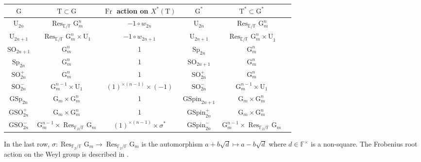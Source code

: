 \documentclass[12pt, reqno]{amsart}
\theoremstyle{definition}
\theoremstyle{definition}
\theoremstyle{definition}
\newcommand{\multiplicativegroup}[1]{#1^{\times}}
\newcommand{\SO}{\mathrm{SO}}
\newcommand{\GSO}{\mathrm{GSO}}
\newcommand{\Sp}{\mathrm{Sp}}
\newcommand{\GSp}{\mathrm{GSp}}
\newcommand{\UnitaryGroup}{\mathrm{U}}
\newcommand{\finiteField}{\mathbb{F}}
\newcommand{\quadraticExtension}{\mathbb{E}}
\newcommand{\finiteFieldExtension}[1]{\finiteField_{#1}}
\newcommand{\Frobenius}{\operatorname{Fr}}
\newcommand{\restrictionOfScalars}[3]{\operatorname{Res}_{#1 \slash #2}{#3}}
\newcommand{\multiplcativeScheme}{\algebraicGroup{G}_m}
\newcommand{\algebraicGroup}[1]{\boldsymbol{\mathrm{#1}}}
\newcommand{\CharacterLattice}[1]{X^{\ast}\left(#1\right)}
\begin{document}
\begin{center}
	\begin{tabular}{|c|c|c|c|c|c|} \hline
		$\algebraicGroup{G}$ & $\algebraicGroup{T} \subset \algebraicGroup{G}$ & $\Frobenius$ action on $\CharacterLattice{\algebraicGroup{T}}$ & $\algebraicGroup{G}^{\ast}$ & $\algebraicGroup{T}^{\ast} \subset \algebraicGroup{G}^{\ast}$ \tabularnewline \hline \hline
		$\algebraicGroup{\UnitaryGroup}_{2n}$ & $\restrictionOfScalars{\quadraticExtension}{\finiteField}{\multiplcativeScheme^{n}}$ & $-1\circ w_{2n}$ & $\algebraicGroup{\UnitaryGroup}_{2n}$ &  $\restrictionOfScalars{\quadraticExtension}{\finiteField}{\multiplcativeScheme^{n}}$ \tabularnewline \hline
		$\algebraicGroup{\UnitaryGroup}_{2n+1}$ & $\restrictionOfScalars{\quadraticExtension}{\finiteField}{\multiplcativeScheme^{n}} \times \algebraicGroup{\UnitaryGroup}_1$ & $-1 \circ w_{2n+1}$ & $\algebraicGroup{\UnitaryGroup}_{2n+1}$ &  $\restrictionOfScalars{\quadraticExtension}{\finiteField}{\multiplcativeScheme^{n} \times \algebraicGroup{\UnitaryGroup}}_1$ \tabularnewline \hline		 				 
		$\algebraicGroup{\SO}_{2n+1}$ & $\multiplcativeScheme^n$ & 1 &$\algebraicGroup{\Sp}_{2n}$ &  $\multiplcativeScheme^n$ \tabularnewline \hline
		$\algebraicGroup{\Sp}_{2n}$ & $\multiplcativeScheme^n$ & 1 &$\algebraicGroup{\SO}_{2n+1}$ & $\multiplcativeScheme^n$ \tabularnewline \hline		 
		$\algebraicGroup{\SO}^{+}_{2n}$ & $\multiplcativeScheme^n$ & 1 &$\algebraicGroup{\SO}^{+}_{2n}$ &  $\multiplcativeScheme^n$ \tabularnewline \hline
		$\algebraicGroup{\SO}^{-}_{2n}$ & $\multiplcativeScheme^{n-1} \times \algebraicGroup{\UnitaryGroup}_1$ & $\left(1\right)^{\times {\left(n-1\right)}} \times \left(-1\right)$ &$\algebraicGroup{\SO}^{-}_{2n}$ &  $\multiplcativeScheme^{n-1} \times \algebraicGroup{\UnitaryGroup}_1$ \tabularnewline \hline
		$\algebraicGroup{\GSp}_{2n}$ & $\multiplcativeScheme \times \multiplcativeScheme^{n}$ & 1 &$\algebraicGroup{GSpin}_{2n+1}$ &  $\multiplcativeScheme \times \multiplcativeScheme^{n}$ \tabularnewline \hline
		$\algebraicGroup{\GSO}^{+}_{2n}$ & $\multiplcativeScheme \times \multiplcativeScheme^{n}$ & 1 & $\algebraicGroup{GSpin}_{2n}^{+}$ &  $\multiplcativeScheme \times \multiplcativeScheme^{n}$ \tabularnewline \hline
		$\algebraicGroup{\GSO}^{-}_{2n}$ & $\multiplcativeScheme^{n-1} \times \restrictionOfScalars{\finiteFieldExtension{2}}{\finiteField}{\multiplcativeScheme}$ & $\left(1\right)^{\times {\left(n-1\right)}} \times \sigma^{\ast}$ & $\algebraicGroup{GSpin}_{2n}^{-}$ &  $\multiplcativeScheme^{n-1} \times \restrictionOfScalars{\finiteFieldExtension{2}}{\finiteField}{\multiplcativeScheme}$ \tabularnewline \hline
	\end{tabular}
\end{center}
In the last row, $\sigma \colon \restrictionOfScalars{\finiteFieldExtension{2}}{\finiteField}{\multiplcativeScheme} \to \restrictionOfScalars{\finiteFieldExtension{2}}{\finiteField}{\multiplcativeScheme}$ is the automorphism $a + b\sqrt{d} \mapsto a - b\sqrt{d}$ where $d \in \multiplicativegroup{\finiteField}$ is a non-square.
The Frobenius root action on the Weyl group is described in . 
\end{document}
